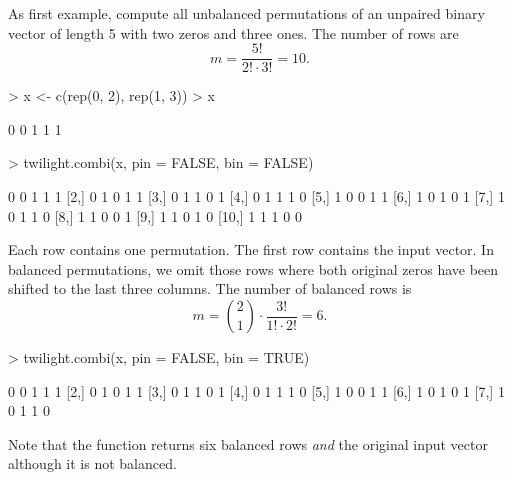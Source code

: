 \documentclass[11pt,a4paper,fleqn]{report}
\begin{document}
As first example, compute all unbalanced permutations of an unpaired binary vector of length 5 with two zeros and three ones. The number of rows are 
\begin{equation}
m = \frac{5!}{2! \cdot 3!} = 10.
\end{equation}
\begin{Schunk}
\begin{Sinput}
> x <- c(rep(0, 2), rep(1, 3))
> x
\end{Sinput}
\begin{Soutput}
[1] 0 0 1 1 1
\end{Soutput}
\end{Schunk}

\begin{Schunk}
\begin{Sinput}
> twilight.combi(x, pin = FALSE, bin = FALSE)
\end{Sinput}
\begin{Soutput}
      [,1] [,2] [,3] [,4] [,5]
 [1,]    0    0    1    1    1
 [2,]    0    1    0    1    1
 [3,]    0    1    1    0    1
 [4,]    0    1    1    1    0
 [5,]    1    0    0    1    1
 [6,]    1    0    1    0    1
 [7,]    1    0    1    1    0
 [8,]    1    1    0    0    1
 [9,]    1    1    0    1    0
[10,]    1    1    1    0    0
\end{Soutput}
\end{Schunk}

Each row contains one permutation. The first row contains the input vector. In balanced permutations, we omit those rows where both original zeros have been shifted to the last three columns. The number of balanced rows is
\begin{equation}
m = {2 \choose 1} \cdot \frac{3!}{1! \cdot 2!} = 6.
\end{equation}
\begin{Schunk}
\begin{Sinput}
> twilight.combi(x, pin = FALSE, bin = TRUE)
\end{Sinput}
\begin{Soutput}
     [,1] [,2] [,3] [,4] [,5]
[1,]    0    0    1    1    1
[2,]    0    1    0    1    1
[3,]    0    1    1    0    1
[4,]    0    1    1    1    0
[5,]    1    0    0    1    1
[6,]    1    0    1    0    1
[7,]    1    0    1    1    0
\end{Soutput}
\end{Schunk}
Note that the function returns six balanced rows \textit{and} the original input vector although it is not balanced.
       
\end{document}
